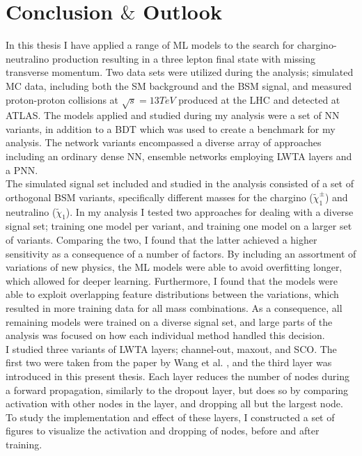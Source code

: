 \newpage
\chapter*{Conclusion $\&$ Outlook}
In this thesis I have applied a range of \ac{ML} models to the search for chargino-neutralino production resulting in 
a three lepton final state with missing transverse momentum. Two data sets were utilized during the analysis; simulated \ac{MC} data, including 
both the \ac{SM} background and the \ac{BSM} signal, and  measured proton-proton collisions at $\sqrt{s} = 13TeV$ produced at the \ac{LHC} and detected 
at \ac{ATLAS}. The models applied and studied during my analysis were a set of \ac{NN} variants, in addition to a \ac{BDT} which was used to 
create a benchmark for my analysis. The network variants encompassed a diverse array of approaches including an ordinary dense \ac{NN}, ensemble networks 
employing \ac{LWTA} layers and a \ac{PNN}.
\\\newline
The simulated signal set included and studied in the analysis consisted of a set of orthogonal \ac{BSM} variants, specifically different masses for the chargino ($\tilde{\chi}^\pm_1$) 
and neutralino ($\tilde{\chi}_1$). In my analysis I tested two approaches for dealing with a diverse signal set; training one model per variant, and training one model on a larger set 
of variants. Comparing the two, I found that the latter achieved a higher sensitivity as a consequence of a number of factors. By including an assortment of variations of new physics, 
the \ac{ML} models were able to avoid overfitting longer, which allowed for deeper learning. Furthermore, I found that the models were able to exploit overlapping feature distributions between 
the variations, which resulted in more training data for all mass combinations. As a consequence, all remaining models were trained on a diverse signal set, and large parts of the analysis 
was focused on how each individual method handled this decision.
\\\newline
I studied three variants of \ac{LWTA} layers; channel-out, maxout, and \ac{SCO}. The first two were taken from the paper by Wang et al. \cite{wang_maxout_2013}, and the third layer was introduced
in this present thesis. Each layer reduces the number of nodes during a forward propagation, similarly to the dropout layer, but does so by comparing activation with other nodes in the layer, and 
dropping all but the largest node. To study the implementation and effect of these layers, I constructed a set of figures to visualize the activation and dropping of nodes, before and after training. 
